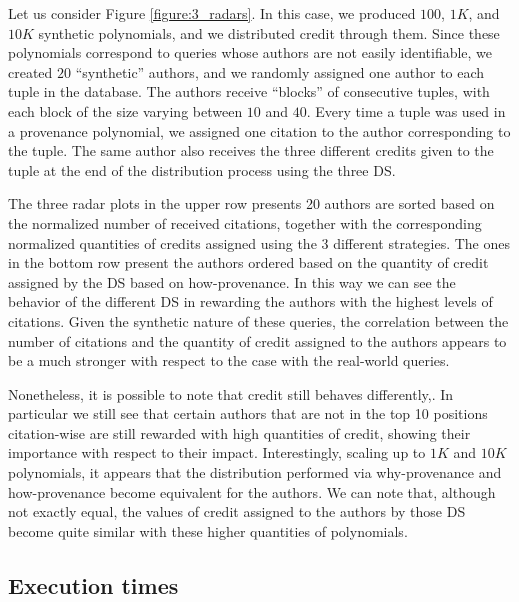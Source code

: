Let us consider Figure \ref{figure:3_radars}.
In this case, we produced $100$, $1K$, and $10K$ synthetic polynomials, and we distributed credit through them. Since these polynomials correspond to queries whose authors are not easily identifiable, we created $20$ ``synthetic'' authors, and we randomly assigned one author to each tuple in the database. The authors receive ``blocks'' of consecutive tuples, with each block of the size varying between $10$ and $40$. 
Every time a tuple was used in a provenance polynomial, we assigned one citation to the author corresponding to the tuple.  The same author also receives the three different credits given to the tuple at the end of the distribution process using the three DS.

The three radar plots in the upper row presents 20 authors are sorted based on the normalized number of received citations, together with the corresponding normalized quantities of credits assigned using the 3 different strategies.
The ones in the bottom row present the authors ordered based on the quantity of credit assigned by the DS based on how-provenance.
In this way we can see the behavior of the different DS in rewarding the authors with the highest levels of citations. 
Given the synthetic nature of these queries, the correlation between the number of citations and the quantity of credit assigned to the authors appears to be a much stronger with respect to the case with the real-world queries.

Nonetheless, it is possible to note that credit still behaves differently,. In particular we still see that certain authors that are not in the top 10 positions citation-wise are still rewarded with high quantities of credit, showing their importance with respect to their impact. 
Interestingly, scaling up to $1K$ and $10K$ polynomials, it appears that the distribution performed via why-provenance and how-provenance become equivalent for the authors. We can note that, although not exactly equal, the values of credit assigned to the authors by those DS become quite similar with these higher quantities of polynomials. 

\subsection{Execution times}

